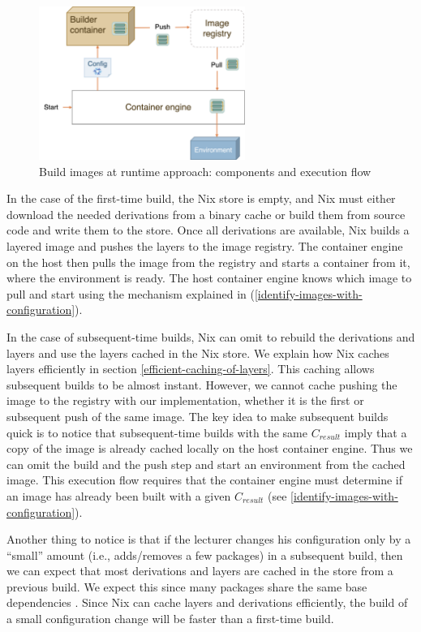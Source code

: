 \begin{figure}
   \centering
   \includegraphics[width=0.6\textwidth]{thesis/graphics/BIAR-execution-flow.png}
   \caption{Build images at runtime approach: components and execution flow} 
   \label{fig:BIAR-execution-flow}
\end{figure}

In the case of the first-time build, the Nix store is empty, and Nix must either download the needed derivations from a binary cache or build them from source code and write them to the store. Once all derivations are available, Nix builds a layered image and pushes the layers to the image registry. The container engine on the host then pulls the image from the registry and starts a container from it, where the environment is ready. The host container engine knows which image to pull and start using the mechanism explained in (\ref{identify-images-with-configuration}). 

In the case of subsequent-time builds, Nix can omit to rebuild the derivations and layers and use the layers cached in the Nix store. We explain how Nix caches layers efficiently in section \ref{efficient-caching-of-layers}. This caching allows subsequent builds to be almost instant. However, we cannot cache pushing the image to the registry with our implementation, whether it is the first or subsequent push of the same image. The key idea to make subsequent builds quick is to notice that subsequent-time builds with the same $C_{result}$ imply that a copy of the image is already cached locally on the host container engine. Thus we can omit the build and the push step and start an environment from the cached image. This execution flow requires that the container engine must determine if an image has already been built with a given $C_{result}$ (see \ref{identify-images-with-configuration}). 

Another thing to notice is that if the lecturer changes his configuration only by a ``small'' amount (i.e., adds/removes a few packages) in a subsequent build, then we can expect that most derivations and layers are cached in the store from a previous build. We expect this since many packages share the same base dependencies \cite{Christensen2018}. Since Nix can cache layers and derivations efficiently, the build of a small configuration change will be faster than a first-time build.

